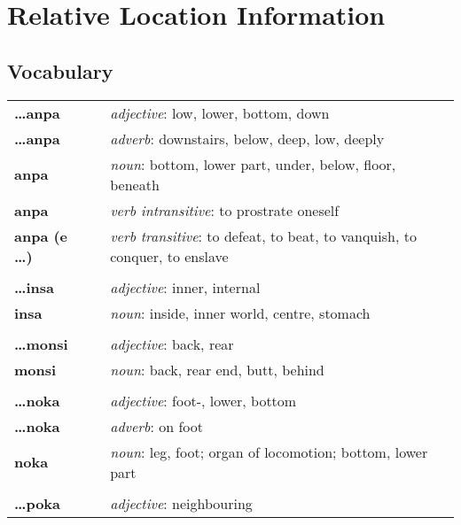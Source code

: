 %
\section{Relative Location Information}
%
%
\subsection*{Vocabulary}
%
\begin{supertabular}{p{2,5cm}|ll}
%
\textbf{\dots anpa} && \textit{adjective}: low, lower, bottom, down \\ %
\textbf{\dots anpa} && \textit{adverb}: downstairs, below, deep, low, deeply \\ %
\textbf{anpa} && \textit{noun}: bottom, lower part, under, below, floor, beneath \\ %
\textbf{anpa} && \textit{verb intransitive}: to prostrate oneself \\ %
\textbf{anpa (e \dots)} && \textit{verb transitive}: to defeat, to beat, to vanquish, to conquer, to enslave \\ %
 && \\ %
%
\textbf{\dots insa} && \textit{adjective}: inner, internal \\ %
\textbf{insa} && \textit{noun}: inside, inner world, centre, stomach \\ %
 && \\ %
%
\textbf{\dots monsi} && \textit{adjective}: back, rear \\ %
\textbf{monsi} && \textit{noun}: back, rear end, butt, behind \\ %
 && \\ %
%
\textbf{\dots noka} && \textit{adjective}: foot-, lower, bottom \\  %
\textbf{ \dots noka } && \textit{adverb}: on foot \\  %
\textbf{noka} && \textit{noun}: leg, foot; organ of locomotion; bottom, lower part \\ %
 && \\ %
%
\textbf{\dots poka} && \textit{adjective}: neighbouring \\ %

\end{supertabular}
